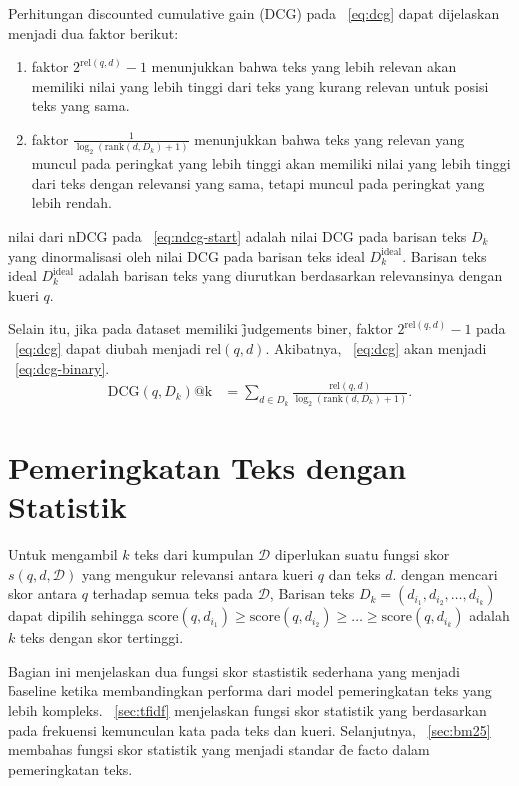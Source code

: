         Perhitungan \f{discounted cumulative gain} (DCG) pada \equ~\ref{eq:dcg} dapat dijelaskan menjadi dua faktor berikut:
        \begin{enumerate}
            \item faktor $2^{\text{rel}(q, d)} - 1$ menunjukkan bahwa teks yang lebih relevan akan memiliki nilai yang lebih tinggi dari teks yang kurang relevan untuk posisi teks yang sama.
            \item faktor $\frac{1}{\log_2(\text{rank}(d, D_k) + 1)}$ menunjukkan bahwa teks yang relevan yang muncul pada peringkat yang lebih tinggi akan memiliki nilai yang lebih tinggi dari teks dengan relevansi yang sama, tetapi muncul pada peringkat yang lebih rendah.
        \end{enumerate}
        nilai dari nDCG pada \equ~\ref{eq:ndcg-start} adalah nilai DCG pada barisan teks $D_k$ yang dinormalisasi oleh nilai DCG pada barisan teks ideal $D_k^{\text{ideal}}$. Barisan teks ideal $D_k^{\text{ideal}}$ adalah barisan teks yang diurutkan berdasarkan relevansinya dengan kueri $q$.

        Selain itu, jika pada \f{dataset} memiliki \f{judgements} biner, faktor $2^{\text{rel}(q, d)} - 1$ pada \equ~\ref{eq:dcg} dapat diubah menjadi $\text{rel}(q, d)$. Akibatnya, \equ~\ref{eq:dcg} akan menjadi \equ~\ref{eq:dcg-binary}.
        \begin{align}
        \label{eq:dcg-binary}
        \text{DCG}(q, D_k)\text{@k} &= \sum_{d \in D_k} \frac{\text{rel}(q, d)}{\log_2(\text{rank}(d, D_k) + 1)}.
        \end{align}


\section{Pemeringkatan Teks dengan Statistik}
        Untuk mengambil $k$ teks dari kumpulan $\mathcal{D}$ diperlukan suatu fungsi skor $s(q, d, \mathcal{D})$ yang mengukur relevansi antara kueri $q$ dan teks $d$. dengan mencari skor antara $q$ terhadap semua teks pada $\mathcal{D}$, Barisan teks $D_k = (d_{i_1}, d_{i_2},\dots, d_{i_k})$ dapat dipilih sehingga $\text{score}(q, d_{i_1}) \geq \text{score}(q, d_{i_2}) \geq \dots \geq \text{score}(q, d_{i_k})$ adalah $k$ teks dengan skor tertinggi.
        
        Bagian ini menjelaskan dua fungsi skor stastistik sederhana yang menjadi \f{baseline} ketika membandingkan performa dari model pemeringkatan teks yang lebih kompleks. \sect~\ref{sec:tfidf} menjelaskan fungsi skor statistik yang berdasarkan pada frekuensi kemunculan kata pada teks dan kueri. Selanjutnya, \sect~\ref{sec:bm25} membahas fungsi skor statistik yang menjadi standar \f{de facto} dalam pemeringkatan teks.

